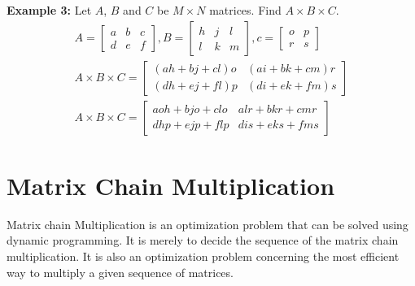 \documentclass[12pt]{report}
\begin{document}
	\textbf{Example 3:}
	Let $A$, $B$ and $C$ be $M \times N$ matrices. Find $A\times B \times C$.
	\begin{align*}
		A= \begin{bmatrix}
			a & b & c\\
			d & e & f
		\end{bmatrix}, B = \begin{bmatrix}
			h & j & l\\
			l & k & m
		\end{bmatrix}, c = \begin{bmatrix}
			o & p\\
			r & s
		\end{bmatrix}\\[0.7cm]
		A \times B \times C = \begin{bmatrix}
			(ah + bj + cl)o & (ai + bk + cm)r\\
			(dh + ej + fl)p & (di + ek + fm)s
		\end{bmatrix}\\[0.7cm]
		A \times B \times C = \begin{bmatrix}
			aoh + bjo + clo & alr + bkr + cmr\\
			dhp + ejp + flp & dis + eks + fms
		\end{bmatrix}
	\end{align*}
	\section{Matrix Chain Multiplication}
	Matrix chain Multiplication is an optimization problem that can be solved using dynamic programming. It is merely to decide the sequence of the matrix chain multiplication. It is also an optimization problem concerning the most efficient way to multiply a given sequence of matrices.
	
	
	
\end{document}
